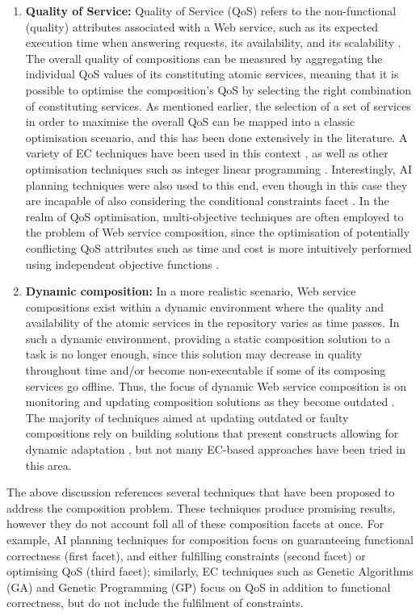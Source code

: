 \begin{enumerate}
 \item \textbf{Quality of Service:} Quality of Service (QoS) refers to the non-functional (quality) attributes associated with a Web service, such as its expected execution time when answering requests, its availability, and its scalability \cite{ko2008quality}. The overall quality of compositions can be measured by aggregating the individual QoS values of its constituting atomic services, meaning that it is possible to optimise the composition's QoS by selecting the right combination of constituting services. As mentioned earlier, the selection of a set of services in order to maximise the overall QoS can be mapped into a classic optimisation scenario, and this has been done extensively in the literature. A variety of EC techniques have been used in this context \cite{wang2012survey}, as well as other optimisation techniques such as integer linear programming \cite{yoo2008web}. Interestingly, AI planning techniques were also used to this end, even though in this case they are incapable of also considering the conditional constraints facet \cite{deng2013efficient}. In the realm of QoS optimisation, multi-objective techniques are often employed to the problem of Web service composition, since the optimisation of potentially conflicting QoS attributes such as time and cost is more intuitively performed using independent objective functions \cite{liu2005dynamic}.
 
 \item \textbf{Dynamic composition:} In a more realistic scenario, Web service compositions exist within a dynamic environment where the quality and availability of the atomic services in the repository varies as time passes. In such a dynamic environment, providing a static composition solution to a task is no longer enough, since this solution may decrease in quality throughout time and/or become non-executable if some of its composing services go offline. Thus, the focus of dynamic Web service composition is on monitoring and updating composition solutions as they become outdated \cite{li2014fault}. The majority of techniques aimed at updating outdated or faulty compositions rely on building solutions that present constructs allowing for dynamic adaptation \cite{alferez2014dynamic}, but not many EC-based approaches have been tried in this area.
\end{enumerate}

The above discussion references several techniques that have been proposed to address the composition problem. These techniques produce promising results,
however they do not account foll all of these composition facets at once. For example, AI planning techniques for composition focus on guaranteeing functional correctness (first facet), and either fulfilling constraints (second facet) or optimising QoS (third facet); similarly, EC techniques such as Genetic Algorithms (GA) and Genetic Programming (GP) focus on QoS in addition to functional correctness, but do not include the fulfilment of constraints.

